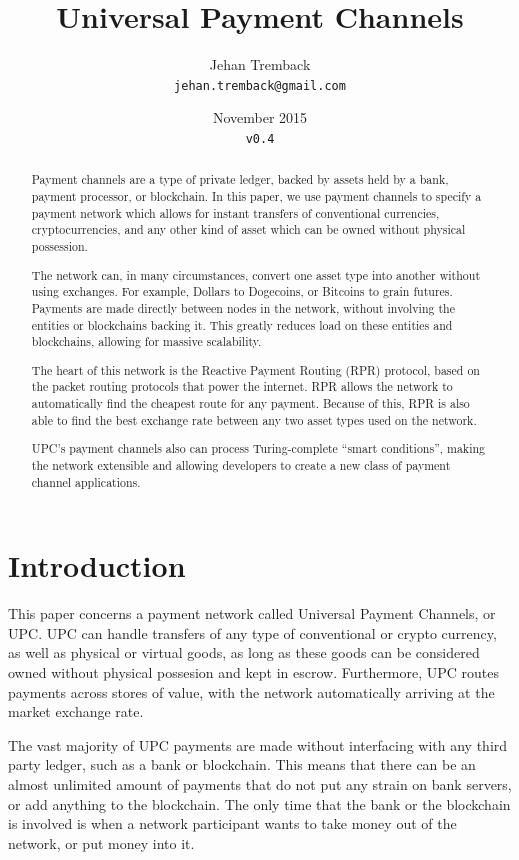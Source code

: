 \documentclass[a4paper]{article}
\title{Universal Payment Channels}
\author{Jehan Tremback\\
\texttt{jehan.tremback@gmail.com}\\}
\date{November 2015\\
\texttt{v0.4}}
\begin{document}
\maketitle

\begin{abstract}
Payment channels are a type of private ledger, backed by assets held by a bank, payment processor, or blockchain. In this paper, we use payment channels to specify a payment network which allows for instant transfers of conventional currencies, cryptocurrencies, and any other kind of asset which can be owned without physical possession.

The network can, in many circumstances, convert one asset type into another without using exchanges. For example, Dollars to Dogecoins, or Bitcoins to grain futures. Payments are made directly between nodes in the network, without involving the entities or blockchains backing it. This greatly reduces load on these entities and blockchains, allowing for massive scalability.

The heart of this network is the Reactive Payment Routing (RPR) protocol, based on the packet routing protocols that power the internet. RPR allows the network to automatically find the cheapest route for any payment. Because of this, RPR is also able to find the best exchange rate between any two asset types used on the network.

UPC's payment channels also can process Turing-complete ``smart conditions'', making the network extensible and allowing developers to create a new class of payment channel applications.
\end{abstract}

\section*{Introduction}

This paper concerns a payment network called Universal Payment Channels, or UPC. UPC can handle transfers of any type of conventional or crypto currency, as well as physical or virtual goods, as long as these goods can be considered owned without physical possesion and kept in escrow. Furthermore, UPC routes payments across stores of value, with the network automatically arriving at the market exchange rate.

The vast majority of UPC payments are made without interfacing with any third party ledger, such as a bank or blockchain. This means that there can be an almost unlimited amount of payments that do not put any strain on bank servers, or add anything to the blockchain. The only time that the bank or the blockchain is involved is when a network participant wants to take money out of the network, or put money into it.
\end{document}
